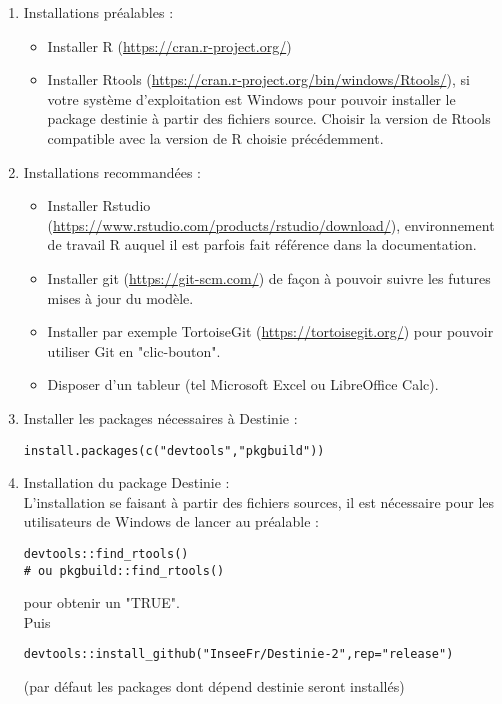 \begin{enumerate}
\item Installations préalables : \\
\begin{itemize}
\item Installer	R (\url{https://cran.r-project.org/}) 
\item Installer	Rtools (\url{https://cran.r-project.org/bin/windows/Rtools/}), si votre système d'exploitation est 				Windows pour pouvoir installer le package destinie à partir des fichiers source. Choisir la version de Rtools compatible 		avec la version de R choisie précédemment. 
\end{itemize}
\item Installations recommandées : \\
\begin{itemize}
\item Installer	Rstudio (\url{https://www.rstudio.com/products/rstudio/download/}), environnement de travail R auquel il est parfois fait référence dans la documentation.
\item Installer git (\url{https://git-scm.com/}) de façon à pouvoir suivre les futures mises à jour du modèle.
\item Installer par exemple TortoiseGit (\url{https://tortoisegit.org/}) pour pouvoir utiliser Git en "clic-bouton".
\item Disposer d'un tableur (tel Microsoft Excel ou LibreOffice Calc).
\end{itemize}
\item Installer les packages nécessaires à Destinie :\\
\begin{lstlisting}
install.packages(c("devtools","pkgbuild"))
\end{lstlisting}
\item Installation du package Destinie :\\
L'installation se faisant à partir des fichiers sources, il est nécessaire pour les utilisateurs de Windows de lancer au préalable : 
\begin{lstlisting}
devtools::find_rtools()
# ou pkgbuild::find_rtools()
\end{lstlisting} pour obtenir un "TRUE".\\
Puis \begin{lstlisting}
devtools::install_github("InseeFr/Destinie-2",rep="release")
\end{lstlisting} (par défaut les packages dont dépend destinie seront installés)
\end{enumerate}

